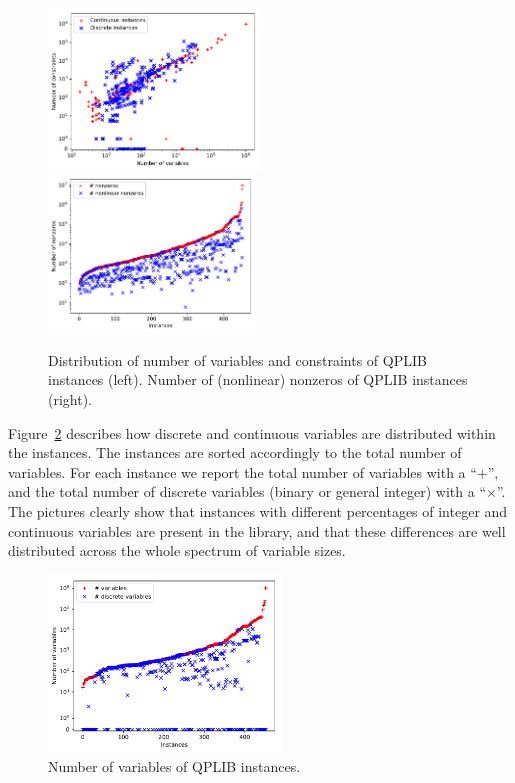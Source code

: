 \begin{figure}\centering
  \includegraphics[width=0.50\textwidth]{pic_overview.pdf}
  \includegraphics[width=0.49\textwidth]{pic_nz.pdf}
  \caption{Distribution of number of variables and constraints of QPLIB instances
(left). Number of (nonlinear) nonzeros of QPLIB instances (right).\label{fig:distribution}}
\end{figure}

Figure~\ref{fig:pic_var}
describes how discrete and continuous
variables are distributed within the instances. The instances are
sorted accordingly to the total number of variables.
For each instance we report the total number of variables with a ``$+$'', and the total number of discrete variables (binary or general integer) with a ``$\times$''. The pictures clearly show that instances with different percentages of integer and continuous variables are present in the library, and that these differences are well distributed across the whole spectrum of variable sizes.

\begin{figure}\centering
  \includegraphics[width=0.55\textwidth]{pic_var.pdf}
  \caption{Number of variables of QPLIB instances. \label{fig:pic_var}}
\end{figure}

